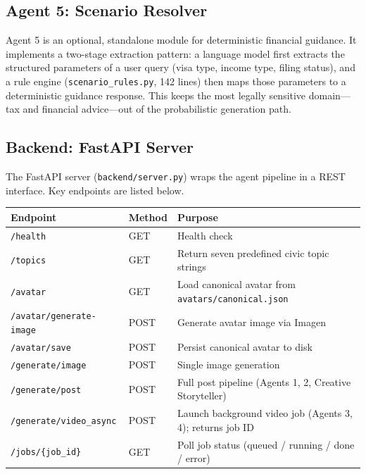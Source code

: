 \documentclass[12pt, letterpaper]{article}
\begin{document}
\subsection{Agent 5: Scenario Resolver}

Agent 5 is an optional, standalone module for deterministic financial guidance. It
implements a two-stage extraction pattern: a language model first extracts the
structured parameters of a user query (visa type, income type, filing status), and
a rule engine (\texttt{scenario\_rules.py}, 142 lines) then maps those parameters to
a deterministic guidance response. This keeps the most legally sensitive domain---tax
and financial advice---out of the probabilistic generation path.

\subsection{Backend: FastAPI Server}

The FastAPI server (\texttt{backend/server.py}) wraps the agent pipeline in a REST
interface. Key endpoints are listed below.

\begin{center}
\begin{tabularx}{\textwidth}{llX}
\toprule
\textbf{Endpoint} & \textbf{Method} & \textbf{Purpose} \\
\midrule
\texttt{/health}               & GET  & Health check \\
\texttt{/topics}               & GET  & Return seven predefined civic topic strings \\
\texttt{/avatar}               & GET  & Load canonical avatar from \texttt{avatars/canonical.json} \\
\texttt{/avatar/generate-image}& POST & Generate avatar image via Imagen \\
\texttt{/avatar/save}          & POST & Persist canonical avatar to disk \\
\texttt{/generate/image}       & POST & Single image generation \\
\texttt{/generate/post}        & POST & Full post pipeline (Agents 1, 2, Creative Storyteller) \\
\texttt{/generate/video\_async}& POST & Launch background video job (Agents 3, 4); returns job ID \\
\texttt{/jobs/\{job\_id\}}     & GET  & Poll job status (queued / running / done / error) \\
\bottomrule
\end{tabularx}
\end{center}
\end{document}
